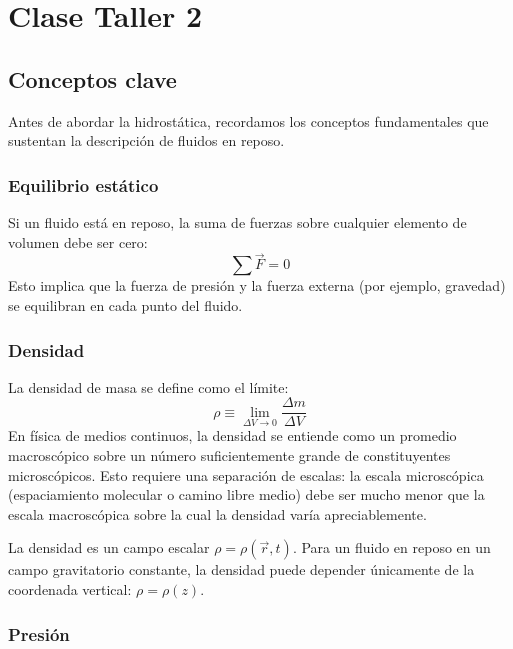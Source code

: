 \chapter{Clase Taller 2}

\section{Conceptos clave}

Antes de abordar la hidrostática, recordamos los conceptos fundamentales que sustentan la descripción de fluidos en reposo.

\subsection{Equilibrio estático}

Si un fluido está en reposo, la suma de fuerzas sobre cualquier elemento de volumen debe ser cero:
\begin{equation}
    \sum \vec{F} = 0
\end{equation}
Esto implica que la fuerza de presión y la fuerza externa (por ejemplo, gravedad) se equilibran en cada punto del fluido.

\subsection{Densidad}

La densidad de masa se define como el límite:
\begin{equation}
    \rho \equiv \lim_{\Delta V \to 0} \frac{\Delta m}{\Delta V}
\end{equation}
En física de medios continuos, la densidad se entiende como un promedio macroscópico sobre un número suficientemente grande de constituyentes microscópicos. Esto requiere una separación de escalas: la escala microscópica (espaciamiento molecular o camino libre medio) debe ser mucho menor que la escala macroscópica sobre la cual la densidad varía apreciablemente.

La densidad es un campo escalar $\rho = \rho(\vec{r}, t)$. Para un fluido en reposo en un campo gravitatorio constante, la densidad puede depender únicamente de la coordenada vertical: $\rho = \rho(z)$.

\subsection{Presión}

